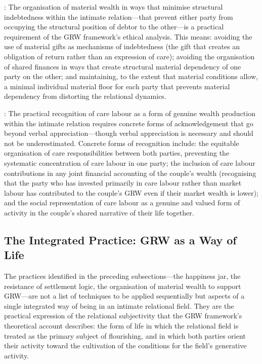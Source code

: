 : The organisation of material wealth in ways that minimise structural indebtedness within the intimate relation---that prevent either party from occupying the structural position of debtor to the other---is a practical requirement of the GRW framework's ethical analysis. This means: avoiding the use of material gifts as mechanisms of indebtedness (the gift that creates an obligation of return rather than an expression of care); avoiding the organisation of shared finances in ways that create structural material dependency of one party on the other; and maintaining, to the extent that material conditions allow, a minimal individual material floor for each party that prevents material dependency from distorting the relational dynamics.

: The practical recognition of care labour as a form of genuine wealth production within the intimate relation requires concrete forms of acknowledgement that go beyond verbal appreciation---though verbal appreciation is necessary and should not be underestimated. Concrete forms of recognition include: the equitable organisation of care responsibilities between both parties, preventing the systematic concentration of care labour in one party; the inclusion of care labour contributions in any joint financial accounting of the couple's wealth (recognising that the party who has invested primarily in care labour rather than market labour has contributed to the couple's GRW even if their market wealth is lower); and the social representation of care labour as a genuine and valued form of activity in the couple's shared narrative of their life together.

\subsection{The Integrated Practice: GRW as a Way of Life}
\label{p15:subsec:integrated_practice}

\noindent
The practices identified in the preceding subsections---the happiness jar, the resistance of settlement logic, the organisation of material wealth to support GRW---are not a list of techniques to be applied sequentially but aspects of a single integrated way of being in an intimate relational field. They are the practical expression of the relational subjectivity that the GRW framework's theoretical account describes: the form of life in which the relational field is treated as the primary subject of flourishing, and in which both parties orient their activity toward the cultivation of the conditions for the field's generative activity.

